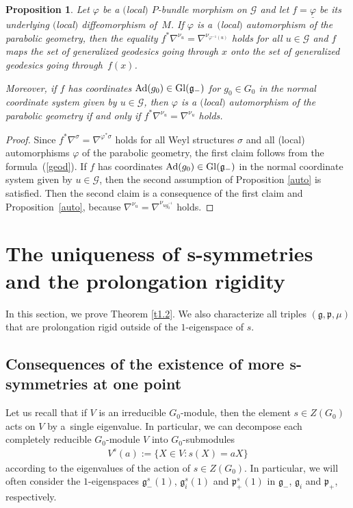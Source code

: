 \documentclass[10pt,a4paper]{amsart}
\newcommand{\si}{\sigma}
\newcommand{\un}{\underline}
\newcommand{\ba}{\mathcal{G}}
\newcommand{\va}{\varphi}
\newcommand{\fg}{\mathfrak g}
\newcommand{\fp}{\mathfrak p}
\newcommand{\Ad}{{\rm Ad}}
\numberwithin{equation}{section}
\newtheorem{Proposition}[Theorem]{Proposition}
 { \theoremstyle{definition}
\newtheorem{Definition}[Theorem]{Definition}
\newtheorem{Example}[Theorem]{Example}
\newtheorem{Remark}[Theorem]{Remark} }
\begin{document}
\begin{Proposition}\label{prop2.4}
Let $\va$ be a $($local$)$ $P$-bundle morphism on $\ba$ and let $f=\un{\va}$ be its underlying $($local$)$ diffeomorphism of~$M$. If $\va$ is a~$($local$)$ automorphism of the parabolic geometry, then the equality $f^*\nabla^{\nu_u}=\nabla^{\nu_{\va^{-1}(u)}}$ holds for all $u\in \ba$ and $f$ maps the set of generalized geodesics going through $x$ onto the set of generalized geodesics going through~$f(x)$.

Moreover, if $f$ has coordinates $\Ad(g_0)\in {\rm Gl}(\fg_-)$ for $g_0\in G_0$ in the normal coordinate system given by $u\in \ba$, then $\va$ is a $($local$)$ automorphism of the parabolic geometry if and only if $f^*\nabla^{\nu_u}=\nabla^{\nu_{u}}$ holds.
\end{Proposition}
\begin{proof}
Since $f^*\nabla^\si=\nabla^{\va^*\si}$ holds for all Weyl structures $\si$ and all (local) automorphisms $\va$ of the parabolic geometry, the f\/irst claim follows from the formula~(\ref{geod}). If $f$ has coordinates $\Ad(g_0)\in {\rm Gl}(\fg_-)$ in the normal coordinate system given by $u\in \ba$, then the second assumption of Proposition \ref{auto} is satisf\/ied. Then the second claim is a consequence of the f\/irst claim and Proposition~\ref{auto}, because $\nabla^{\nu_u}=\nabla^{\nu_{ug_0^{-1}}}$ holds.
\end{proof}

\section[The uniqueness of $s$-symmetries and the prolongation rigidity]{The uniqueness of $\boldsymbol{s}$-symmetries and the prolongation rigidity}\label{SEC3}

In this section, we prove Theorem \ref{t1.2}. We also characterize all triples $(\fg,\fp,\mu)$ that are prolongation rigid outside of the $1$-eigenspace of $s$.

\subsection[Consequences of the existence of more $s$-symmetries at one point]{Consequences of the existence of more $\boldsymbol{s}$-symmetries at one point}\label{sec3.1}

Let us recall that if $V$ is an irreducible $G_0$-module, then the element $s\in Z(G_0)$ acts on $V$ by a~single eigenvalue. In particular, we can decompose each completely reducible $G_0$-module $V$ into $G_0$-submodules \begin{gather*}V^s(a):=\{X\in V\colon s(X)=aX\}\end{gather*}
according to the eigenvalues of the action of $s\in Z(G_0)$. In particular, we will often consider the $1$-eigenspaces $\fg_-^s(1)$, $\fg_i^s(1)$ and $\fp_+^s(1)$ in $\fg_-$, $\fg_i$ and $\fp_+$, respectively.
\end{document}
